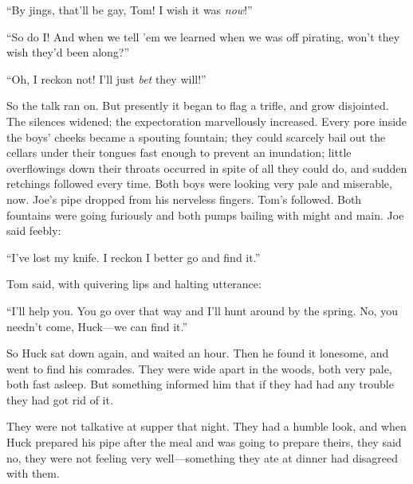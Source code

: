 \documentclass{book}
\begin{document}
“By jings, that’ll be gay, Tom! I wish it was \emph{now}!”

“So do I! And when we tell ’em we learned when we was off pirating, won’t they wish they’d been along?”

“Oh, I reckon not! I’ll just \emph{bet} they will!”

So the talk ran on. But presently it began to flag a trifle, and grow disjointed. The silences widened; the expectoration marvellously increased. Every pore inside the boys’ cheeks became a spouting fountain; they could scarcely bail out the cellars under their tongues fast enough to prevent an inundation; little overflowings down their throats occurred in spite of all they could do, and sudden retchings followed every time. Both boys were looking very pale and miserable, now. Joe’s pipe dropped from his nerveless fingers. Tom’s followed. Both fountains were going furiously and both pumps bailing with might and main. Joe said feebly:

“I’ve lost my knife. I reckon I better go and find it.”

Tom said, with quivering lips and halting utterance:

“I’ll help you. You go over that way and I’ll hunt around by the spring. No, you needn’t come, Huck—we can find it.”

So Huck sat down again, and waited an hour. Then he found it lonesome, and went to find his comrades. They were wide apart in the woods, both very pale, both fast asleep. But something informed him that if they had had any trouble they had got rid of it.

They were not talkative at supper that night. They had a humble look, and when Huck prepared his pipe after the meal and was going to prepare theirs, they said no, they were not feeling very well—something they ate at dinner had disagreed with them.
\end{document}
